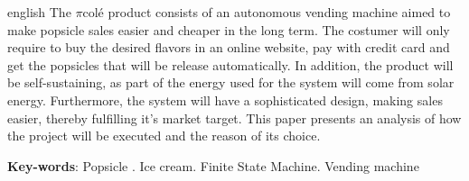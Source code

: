 \begin{resumo}[Abstract]
 \begin{otherlanguage*}{english}
The $\pi$colé product consists of an autonomous vending machine aimed to make popsicle sales easier and cheaper in the long term. The costumer will only require to buy the desired flavors in an online website, pay with credit card and get the popsicles that will be release automatically. In addition, the product will be self-sustaining, as part of the energy used for the system will come from solar energy. Furthermore, the system will have a sophisticated design, making sales easier, thereby fulfilling it's market target. This paper presents an analysis of how the project will be executed and the reason of its choice.

   \vspace{\onelineskip}
 
   \noindent 
   \textbf{Key-words}: Popsicle . Ice cream. Finite State Machine. Vending machine
 \end{otherlanguage*}
\end{resumo}
